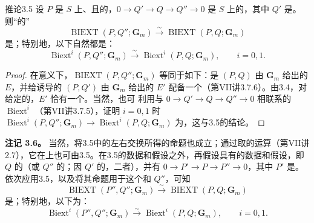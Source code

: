 \begin{SGAresult}{推论}{3.5}
设 $P$ 是 $S$ 上、且的，$0\to Q'\to Q\to Q''\to0$ 是 $S$ 上的，其中 $Q'$ 是。则“的”
\[
\operatorname{BIEXT}(P,Q'';\mathbf G_m)\xrightarrow{\sim}\operatorname{BIEXT}(P,Q;\mathbf G_m)\tag{3.5.1}
\]
是；特别地，以下自然都是：
\[
\operatorname{Biext}^i(P,Q'';\mathbf G_m)\xrightarrow{\sim}\operatorname{Biext}^i(P,Q;\mathbf G_m),\qquad i=0,1.\tag{3.5.2}
\]
\end{SGAresult}
\begin{proof}
在意义下，$\operatorname{BIEXT}(P,Q'';\mathbf G_m)$ 等同于如下：是 $(P,Q)$ 由 $\mathbf G_m$ 给出的 $E$，并给诱导的 $(P,Q')$ 由 $\mathbf G_m$ 给出的 $E'$ 配备一个（第VII讲3.7.6）。由3.4，对给定的，$E'$ 恰有一个。当然，也可
利用与 $0\to Q'\to Q\to Q''\to0$ 相联系的 $\operatorname{Biext}^i$ （第VII讲3.7.5），证明 $i=0,1$ 时 $\operatorname{Biext}^i(P,Q'';\mathbf G_m)\to\operatorname{Biext}^i(P,Q;\mathbf G_m)$ 为，这与3.5的结论。
\end{proof}
\textbf{注记 3.6。} 当然，将3.5中的左右交换所得的命题也成立；通过取的运算（第VII讲2.7），它在上也可由3.5。在3.5的数据和假设之外，再假设具有的数据和假设，即 $Q$ 的（或 $Q''$ 的；因 $Q'$ 的，二者），并有 $0\to P'\to P\to P''\to0$，其中 $P'$ 是。依次应用3.5，以及将其命题用于这个和 $Q''$，可知
\[
\operatorname{BIEXT}(P'',Q'';\mathbf G_m)\xrightarrow{\sim}\operatorname{BIEXT}(P,Q;\mathbf G_m)\tag{3.6.1}
\]
是；特别地，以下为：
\[
\operatorname{Biext}^i(P'',Q'';\mathbf G_m)\xrightarrow{\sim}\operatorname{Biext}^i(P,Q;\mathbf G_m),\qquad i=0,1.\tag{3.6.2}
\]

